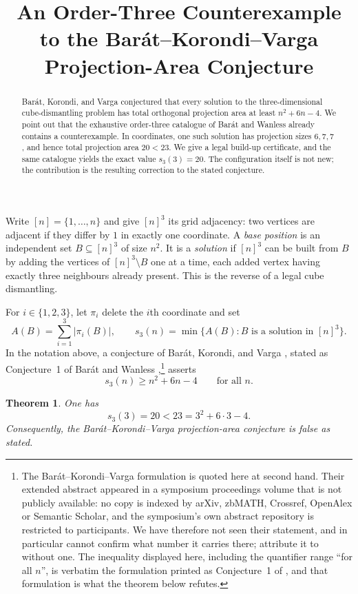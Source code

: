 \documentclass[11pt]{amsart}
\title[An order-three projection-area counterexample]
{An Order-Three Counterexample to the
Bar\'at--Korondi--Varga Projection-Area Conjecture}
\date{}
\newtheorem{theorem}{Theorem}
\begin{document}
\begin{abstract}
Bar\'at, Korondi, and Varga conjectured that every solution to the
three-dimensional cube-dismantling problem has total orthogonal projection
area at least $n^2+6n-4$. We point out that the exhaustive order-three
catalogue of Bar\'at and Wanless already contains a counterexample. In
coordinates, one such solution has projection sizes $6,7,7$, and hence total
projection area $20<23$. We give a legal build-up certificate, and the same
catalogue yields the exact value $s_3(3)=20$. The configuration itself is not
new; the contribution is the resulting correction to the stated conjecture.
\end{abstract}

\maketitle

Write $[n]=\{1,\ldots,n\}$ and give $[n]^3$ its grid adjacency: two
vertices are adjacent if they differ by $1$ in exactly one coordinate. A
\emph{base position} is an independent set $B\subseteq[n]^3$ of size $n^2$.
It is a \emph{solution} if $[n]^3$ can be built from $B$ by adding the
vertices of $[n]^3\setminus B$ one at a time, each added vertex having
exactly three neighbours already present. This is the reverse of a legal
cube dismantling.

For $i\in\{1,2,3\}$, let $\pi_i$ delete the $i$th coordinate and set
\[
 A(B)=\sum_{i=1}^3 |\pi_i(B)|,
 \qquad
 s_3(n)=\min\{A(B):B\text{ is a solution in }[n]^3\}.
\]
In the notation above, a conjecture of Bar\'at, Korondi, and Varga
\cite{BKV}, stated as Conjecture~1 of Bar\'at and Wanless
\cite{BW},\footnote{The Bar\'at--Korondi--Varga formulation is quoted here at
second hand. Their extended abstract appeared in a symposium proceedings
volume that is not publicly available: no copy is indexed by arXiv, zbMATH,
Crossref, OpenAlex or Semantic Scholar, and the symposium's own abstract
repository is restricted to participants. We have therefore not seen their
statement, and in particular cannot confirm what number it carries there;
\cite{BW} attribute it to \cite{BKV} without one. The inequality displayed
here, including the quantifier range ``for all $n$'', is verbatim the
formulation printed as Conjecture~1 of \cite{BW}, and that formulation is
what the theorem below refutes.} asserts
\[
 s_3(n)\ge n^2+6n-4 \qquad\text{for all }n.
\]

\begin{theorem}
One has
\[
 s_3(3)=20<23=3^2+6\cdot3-4.
\]
Consequently, the Bar\'at--Korondi--Varga projection-area conjecture is
false as stated.
\end{theorem}
\end{document}
